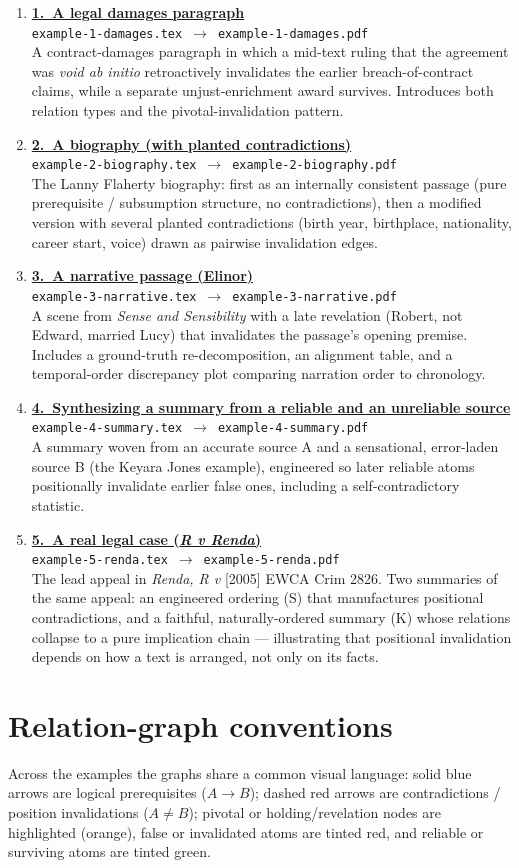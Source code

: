 \documentclass[11pt]{article}
\newcommand{\examplelink}[3]{%
  \item \textbf{\href{run:./#1.pdf}{#2}}\\%
  \nolinkurl{#1.tex}\, $\rightarrow$ \,\nolinkurl{#1.pdf}\\[2pt]%
  #3\par\medskip%
}
\begin{document}
\begin{enumerate}[leftmargin=*]

  \examplelink{example-1-damages}{1.\ A legal damages paragraph}{%
    A contract-damages paragraph in which a mid-text ruling that the agreement
    was \emph{void ab initio} retroactively invalidates the earlier
    breach-of-contract claims, while a separate unjust-enrichment award survives.
    Introduces both relation types and the pivotal-invalidation pattern.}

  \examplelink{example-2-biography}{2.\ A biography (with planted contradictions)}{%
    The Lanny Flaherty biography: first as an internally consistent passage
    (pure prerequisite / subsumption structure, no contradictions), then a
    modified version with several planted contradictions (birth year, birthplace,
    nationality, career start, voice) drawn as pairwise invalidation edges.}

  \examplelink{example-3-narrative}{3.\ A narrative passage (Elinor)}{%
    A scene from \emph{Sense and Sensibility} with a late revelation
    (Robert, not Edward, married Lucy) that invalidates the passage's opening
    premise. Includes a ground-truth re-decomposition, an alignment table, and a
    temporal-order discrepancy plot comparing narration order to chronology.}

  \examplelink{example-4-summary}{4.\ Synthesizing a summary from a reliable and an unreliable source}{%
    A summary woven from an accurate source A and a sensational, error-laden
    source B (the Keyara Jones example), engineered so later reliable atoms
    positionally invalidate earlier false ones, including a self-contradictory
    statistic.}

  \examplelink{example-5-renda}{5.\ A real legal case (\emph{R v Renda})}{%
    The lead appeal in \emph{Renda, R v} [2005] EWCA Crim 2826. Two summaries of
    the same appeal: an engineered ordering (S) that manufactures positional
    contradictions, and a faithful, naturally-ordered summary (K) whose relations
    collapse to a pure implication chain --- illustrating that positional
    invalidation depends on how a text is arranged, not only on its facts.}

\end{enumerate}

\section*{Relation-graph conventions}

Across the examples the graphs share a common visual language: solid blue arrows
are logical prerequisites ($A \rightarrow B$); dashed red arrows are
contradictions / position invalidations ($A \neq B$); pivotal or
holding/revelation nodes are highlighted (orange), false or invalidated atoms are
tinted red, and reliable or surviving atoms are tinted green.
\end{document}
